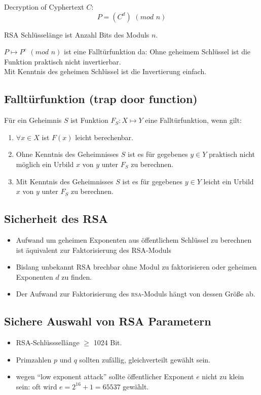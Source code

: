 Decryption of Cyphertext $C$:
$$ P = (C^d) \hspace{4pt} (mod \hspace{4pt} n)  $$

RSA Schlüsselänge ist Anzahl Bits des Moduls $n$.

$ P \mapsto P^e \hspace{4pt} (mod \hspace{4pt} n) $ ist eine Falltürfunktion da:
Ohne geheimem Schlüssel ist die Funktion praktisch nicht invertierbar. \\
Mit Kenntnis des geheimen Schlüssel ist die Invertierung einfach.

\subsection{Falltürfunktion (trap door function)}
 Für ein Geheimnis $S$ ist Funktion $F_S: X \mapsto Y$ eine Falltürfunktion, wenn gilt:
 \begin{enumerate}
  \item $\forall x \in X$ ist $F(x)$ leicht berechenbar.
  \item Ohne Kenntnis des Geheimnisses $S$ ist es für gegebenes $y \in Y$ praktisch nicht möglich ein Urbild $x$ von $y$ unter $F_S$ zu berechnen.
  \item Mit Kenntnis des Geheimnisses $S$ ist es für gegebenes $y \in Y$ leicht ein Urbild $x$ von $y$ unter $F_S$ zu berechnen. 
\end{enumerate}

\subsection{Sicherheit des RSA}
\begin{itemize}
  \item Aufwand um geheimen Exponenten aus öffentlichem Schlüssel zu berechnen ist äquivalent zur Faktorisierung des RSA-Moduls
  \item Bislang unbekannt RSA brechbar ohne Modul zu faktorisieren oder geheimen Exponenten $d$ zu finden.
  \item Der Aufwand zur Faktorisierung des \textsc{rsa}-Moduls hängt von dessen Größe ab.
\end{itemize}

\subsection{Sichere Auswahl von RSA Parametern}
\begin{itemize}
  \item RSA-Schlüsssellänge $\geq$ 1024 Bit.
  \item Primzahlen $p$ und $q$ sollten zufällig, gleichverteilt gewählt sein.
  \item wegen "`low exponent attack"' sollte öffentlicher Exponent $e$ nicht zu klein sein: oft wird $e = 2^{16}+1 = 65537$ gewählt.
\end{itemize}







